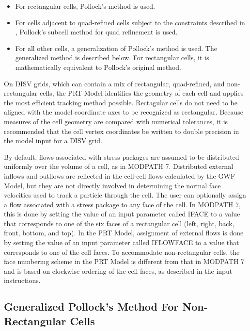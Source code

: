\begin{itemize}
\item For rectangular cells, Pollock's method \citep{pollock2016modpath7} is used.
\item For cells adjacent to quad-refined cells subject to the constraints described in \citep{pollock2016modpath7}, Pollock's subcell method for quad refinement \citep{pollock2015} is used.
\item For all other \mf cells, a generalization of Pollock's method is used. The generalized method is described below. For rectangular cells, it is mathematically equivalent to Pollock's original method.
\end{itemize}

\noindent On DISV grids, which can contain a mix of rectangular, quad-refined, and non-rectangular cells, the PRT Model identifies the geometry of each cell and applies the most efficient tracking method possible. Rectagular cells do not need to be aligned with the model coordinate axes to be recognized as rectangular. Because measures of the cell geometry are compared with numerical tolerances, it is recommended that the cell vertex coordinates be written to double precision in the model input for a DISV grid.

By default, flows associated with stress packages are assumed to be distributed uniformly over the volume of a cell, as in MODPATH 7. Distributed external inflows and outflows are reflected in the cell-cell flows calculated by the GWF Model, but they are not directly involved in determining the normal face velocities used to track a particle through the cell. The user can optionally assign a flow associated with a stress package to any face of the cell. In MODPATH 7, this is done by setting the value of an input parameter called IFACE to a value that corresponds to one of the six faces of a rectangular cell (left, right, back, front, bottom, and top). In the PRT Model, assignment of external flows is done by setting the value of an input parameter called IFLOWFACE to a value that corresponds to one of the cell faces. To accommodate non-rectangular cells, the face numbering scheme in the PRT Model is different from that in MODPATH 7 and is based on clockwise ordering of the cell faces, as described in the \mf input instructions.

\subsection{Generalized Pollock's Method For Non-Rectangular Cells} \label{sec:genpollockmethod}

